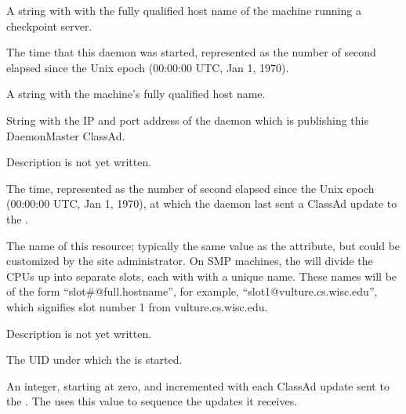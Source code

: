 \begin{description}

\item[\AdAttr{CkptServer}:] A string with with the fully qualified
  host name of the machine running a checkpoint server.

\item[\AdAttr{DaemonStartTime}:] The time that this daemon was
  started, represented as the number of second elapsed since
  the Unix epoch (00:00:00 UTC, Jan 1, 1970).

\item[\AdAttr{Machine}:] A string with the machine's fully qualified 
  host name.

\item[\AdAttr{MasterIpAddr}:] String with the IP and port address of the
 daemon which is publishing this DaemonMaster ClassAd.

\item[\AdAttr{MyAddress}:] Description is not yet written.

\item[\AdAttr{MyCurrentTime}:] The time, represented as the number of
  second elapsed since the Unix epoch (00:00:00 UTC, Jan 1, 1970),
  at which the  daemon last sent a ClassAd update to the
  .

\item[\AdAttr{Name}:] The name of this resource; typically the same value as
  the  attribute, but could be customized by the site
  administrator.
  On SMP machines, the  will divide the CPUs up into separate
  slots, each with with a unique name.
  These names will be of the form ``slot\#@full.hostname'', for example,
  ``slot1@vulture.cs.wisc.edu'', which signifies slot number 1 from
  vulture.cs.wisc.edu.

\item[\AdAttr{PublicNetworkIpAddr}:] Description is not yet written.

\item[\AdAttr{RealUid}:] The UID under which the  is started.

\item[\AdAttr{UpdateSequenceNumber}:] An integer, starting at zero,
  and incremented with each ClassAd update sent to the .
  The  uses this value to sequence the updates it
  receives.

\end{description}

